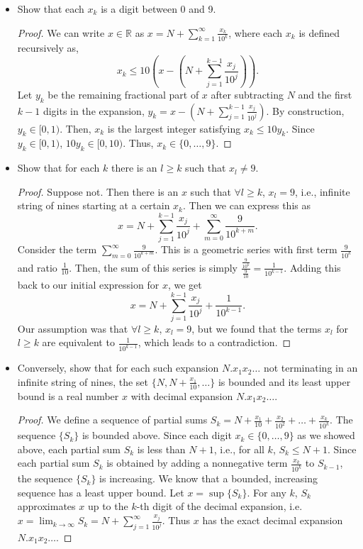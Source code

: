\documentclass[12pt]{article}
\newcommand{\bbR}{\mathbb{R}}
\renewcommand{\_}[1]{\underline{ #1 }}
\theoremstyle{definition}
\newenvironment{exercise}[1]
  {\renewcommand\theinnercustomthm{#1}\innercustomthm}
  {\endinnercustomthm}
\numberwithin{equation}{subsection}
\begin{document}
\begin{exercise}{18}
    \begin{itemize}
        \item [(a)] Show that each $x_k$ is a digit between 0 and 9. 
        \begin{proof}
            We can write $x \in \bbR$ as $x = N + \sum_{k = 1}^\infty \frac{x_k}{10^k}$, where each $x_k$ is defined recursively as, $$x_k \le 10 \left( x - \left( N + \sum_{j = 1}^{k -1} \frac{x_j}{10^j} \right) \right).$$ Let $y_k$ be the remaining fractional part of $x$ after subtracting $N$ and the first $k - 1$ digits in the expansion, $y_k = x - \left( N + \sum_{j = 1}^{k-1} \frac{x_j}{10^j} \right)$. By construction, $y_k \in [0, 1)$. Then, $x_k$ is the largest integer satisfying $x_k \le 10y_k$. Since $y_k \in [0, 1)$, $10y_k \in [0, 10)$. Thus, $x_k \in \{ 0, \dots, 9 \}$.  
        \end{proof}
        \item [(b)] Show that for each $k$ there is an $l \ge k$ such that $x_l \neq 9$. 
        \begin{proof}
            Suppose not. Then there is an $x$ such that $\forall l \ge k$, $x_l = 9$, i.e., infinite string of nines starting at a certain $x_k$. Then we can express this as $$x = N + \sum_{j = 1}^{k-1} \frac{x_j}{10^j} + \sum_{m = 0}^\infty \frac{9}{10^{k+m}}.$$ Consider the term $\sum_{m = 0}^\infty \frac{9}{10^{k+m}}$. This is a geometric series with first term $\frac{9}{10^k}$ and ratio $\frac{1}{10}$. Then, the sum of this series is simply $\displaystyle \frac{\frac{9}{10^k}}{\frac{9}{10}} = \frac{1}{10^{k - 1}}$. Adding this back to our initial expression for $x$, we get $$x = N + \sum_{j = 1}^{k-1} \frac{x_j}{10^j} + \frac{1}{10^{k - 1}}.$$ Our assumption was that $\forall l \ge k$, $x_l = 9$, but we found that the terms $x_l$ for $l \ge k$ are equivalent to $\frac{1}{10^{k-1}}$, which leads to a contradiction. 
        \end{proof}
        \item [(c)] Conversely, show that for each such expansion $N.x_1x_2\dots$ not terminating in an infinite string of nines, the set $\{ N, N + \frac{x_1}{10}, \dots \}$ is bounded and its least upper bound is a real number $x$ with decimal expansion $N.x_1x_2\dots$. 
        \begin{proof}
            We define a sequence of partial sums $S_k = N + \frac{x_1}{10} + \frac{x_2}{10^2} + \dots + \frac{x_k}{10^k}$. The sequence $\{ S_k \}$ is bounded above. Since each digit $x_k \in \{ 0, \dots, 9 \}$ as we showed above, each partial sum $S_k$ is less than $N + 1$, i.e., for all $k$, $S_k \le N + 1$. Since each partial sum $S_k$ is obtained by adding a nonnegative term $\frac{x_k}{10^k}$ to $S_{k -1}$, the sequence $\{ S_k \}$ is increasing. We know that a bounded, increasing sequence has a least upper bound. Let $x = \sup \{ S_k \}$. For any $k$, $S_k$ approximates $x$ up to the $k$-th digit of the decimal expansion, i.e. $x = \displaystyle \lim_{k \to \infty} S_k = N + \displaystyle \sum_{j = 1}^\infty \frac{x_j}{10^j}$. Thus $x$ has the exact decimal expansion $N.x_1x_2\dots$. 

\end{proof}
\end{itemize}
\end{exercise}
\end{document}
